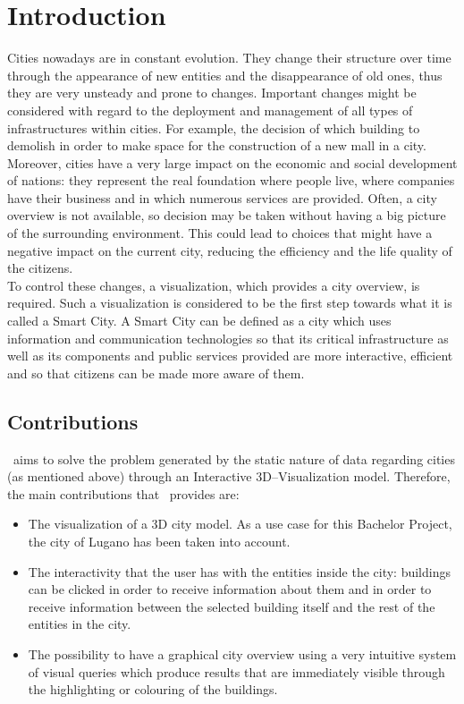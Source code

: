 \section{Introduction} \label{introduction}
Cities nowadays are in constant evolution. They change their structure over time through the appearance of new entities and the disappearance of old ones, thus they are very unsteady and prone to changes. Important changes might be considered with regard to the deployment and management of all types of infrastructures within cities. For example, the decision of which building to demolish in order to make space for the construction of a new mall in a city.\\

Moreover, cities have a very large impact on the economic and social development of nations: they represent the real foundation where people live, where companies have their business and in which numerous services are provided. Often, a city overview is not available, so decision may be taken without having a big picture of the surrounding environment. This could lead to choices that might have a negative impact on the current city, reducing the efficiency and the life quality of the citizens.\\

To control these changes, a visualization, which provides a city overview, is required. Such a visualization is considered to be the first step towards what it is called a Smart City. A Smart City can be defined as a city which uses information and communication technologies so that its critical infrastructure as well as its components and public services provided are more interactive, efficient and so that citizens can be made more aware of them.\\


\subsection{Contributions}
\applicationName\ aims to solve the problem generated by the static nature of data regarding cities (as mentioned above) through an Interactive 3D--Visualization model. Therefore, the main contributions that \applicationName\ provides are:
\begin{itemize}
	\item The visualization of a 3D city model. As a use case for this Bachelor Project, the city of Lugano has been taken into account.
	\item The interactivity that the user has with the entities inside the city: buildings can be clicked in order to receive information about them and in order to receive information between the selected building itself and the rest of the entities in the city.
	\item The possibility to have a graphical city overview using a very intuitive system of visual queries which produce results that are immediately visible through the highlighting or colouring of the buildings. 
\end{itemize} 
